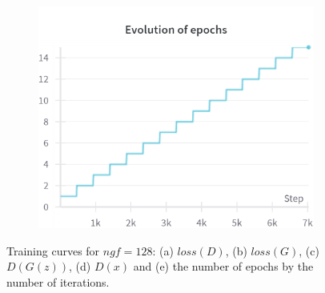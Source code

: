 \begin{figure}[H]
    \begin{subfigure}{0.45\textwidth}
        \centering
        \includegraphics[width=0.95\linewidth]{ngf/128/epochs.png}
        \caption{}
        \label{subfig:ngf/128/epochs}
    \end{subfigure}%

    \caption{Training curves for $ngf=128$: (a) $loss(D)$, (b) $loss(G)$, (c) $D(G(z))$, (d) $D(x)$ and (e) the number of epochs by the number of iterations.}
    \label{fig:ngf/128_losses}
\end{figure}

